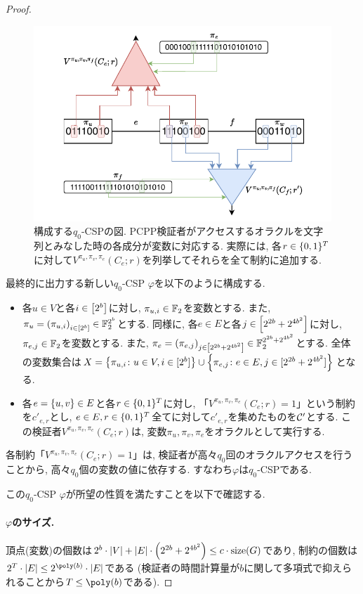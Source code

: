 \begin{proof}
  \begin{figure}[ht]
    \centering
    \includegraphics[width=\textwidth]{images/newCSP2.pdf}
    \caption{構成する$q_0$-CSPの図. PCPP検証者がアクセスするオラクルを文字列とみなした時の各成分が変数に対応する. 実際には, 各$r\in\{0,1\}^T$に対して$V^{\pi_u,\pi_v,\pi_e}(C_e;r)$を列挙してそれらを全て制約に追加する. \label{fig:newCSP2}}
  \end{figure}
  
  最終的に出力する新しい$q_0$-CSP $\varphi$を以下のように構成する.
  \begin{itemize}
    \item 各$u\in V$と各$i\in \qty[2^b]$に対し, $\pi_{u,i}\in\mathbb{F}_2$を変数とする. また, $\pi_u=\qty(\pi_{u,i})_{i\in[2^b]}\in \mathbb{F}_2^{2^b}$とする. 同様に, 各$e\in E$と各$j\in \qty[ 2^{2b} + 2^{4b^2} ]$に対し, $\pi_{e,j}\in\mathbb{F}_2$を変数とする. また, $\pi_e=\qty(\pi_{e,j})_{j\in\qty[2^{2b} + 2^{4b^2}]}\in \mathbb{F}_2^{2^{2b} + 2^{4b^2}}$とする. 全体の変数集合は$X=\qty{\pi_{u,i}\colon u\in V,i\in[2^b]} \cup \qty{\pi_{e,j}\colon e\in E,j\in[2^{2b} + 2^{4b^2}]}$となる.
    \item 各$e=\qty{u,v}\in E$と各$r\in\{0,1\}^{T}$に対し, 「$V^{\pi_u,\pi_v,\pi_e}(C_e;r)=1$」という制約を$c'_{e,r}$とし, $e\in E,r\in\{0,1\}^T$全てに対して$c'_{e,r}$を集めたものを$\mathcal{C}'$とする. この検証者$V^{\pi_u,\pi_v,\pi_e}(C_e;r)$は, 変数$\pi_u,\pi_v,\pi_e$をオラクルとして実行する.
  \end{itemize}
  各制約「$V^{\pi_u,\pi_v,\pi_e}(C_e;r)=1$」は, 検証者が高々$q_0$回のオラクルアクセスを行うことから, 高々$q_0$個の変数の値に依存する. すなわち$\varphi$は$q_0$-CSPである.

  この$q_0$-CSP $\varphi$が所望の性質を満たすことを以下で確認する.
  \paragraph*{$\varphi$のサイズ.}
  頂点(変数)の個数は$2^b\cdot\abs{V} + \abs{E}\cdot\qty(2^{2b} + 2^{4b^2}) \le c\cdot\mathrm{size}(G)$であり,
  制約の個数は$2^T\cdot\abs{E} \le 2^{\poly(b)}\cdot\abs{E}$である (検証者の時間計算量が$b$に関して多項式で抑えられることから$T\le\poly(b)$である).
  

\end{proof}
